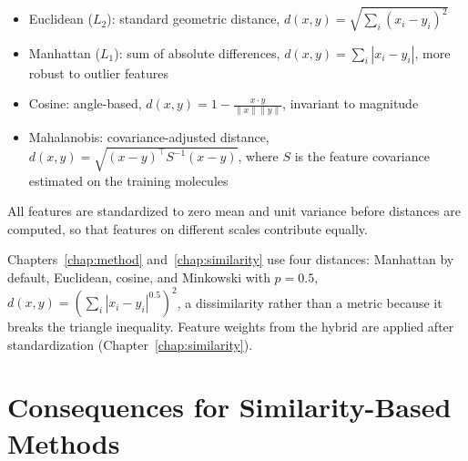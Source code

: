 \begin{itemize}
    \item Euclidean ($L_2$): standard geometric distance, $d(x, y) = \sqrt{\sum_i (x_i - y_i)^2}$
    \item Manhattan ($L_1$): sum of absolute differences, $d(x, y) = \sum_i |x_i - y_i|$, more robust to outlier features
    \item Cosine: angle-based, $d(x, y) = 1 - \frac{x \cdot y}{\|x\| \|y\|}$, invariant to magnitude
    \item Mahalanobis: covariance-adjusted distance, $d(x,y)=\sqrt{(x-y)^\top S^{-1}(x-y)}$, where $S$ is the feature covariance estimated on the training molecules \citep{Mahalanobis1936}
\end{itemize}

All features are standardized to zero mean and unit variance before distances are computed, so that features on different scales contribute equally. %

Chapters~\ref{chap:method} and~\ref{chap:similarity} use four distances: Manhattan by default, Euclidean, cosine, and Minkowski with $p=0.5$, $d(x,y)=\left(\sum_i |x_i-y_i|^{0.5}\right)^{2}$, a dissimilarity rather than a metric because it breaks the triangle inequality. Feature weights from the hybrid are applied after standardization (Chapter~\ref{chap:similarity}).


\section{Consequences for Similarity-Based Methods}\label{sec:flaws:consequences}


